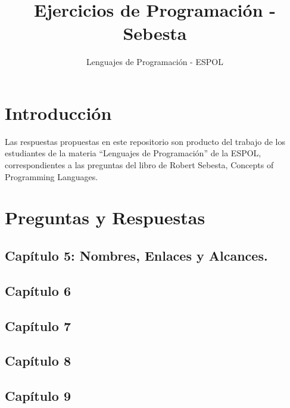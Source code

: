 \documentclass[12pt,oneside]{article}
\title{Ejercicios de Programación - Sebesta}
\author{Lenguajes de Programación - ESPOL}
\begin{document}
\maketitle

\section{Introducción}
Las respuestas propuestas en este repositorio son producto del trabajo de los estudiantes de la materia ``Lenguajes de Programación'' de la ESPOL, correspondientes a las preguntas del libro de Robert Sebesta, Concepts of Programming Languages.

\section{Preguntas y Respuestas}

\subsection{Capítulo 5: Nombres, Enlaces y Alcances.}




\subsection{Capítulo 6}


%
\subsection{Capítulo 7}






%
\subsection{Capítulo 8}



\subsection{Capítulo 9}
%


\end{document}
